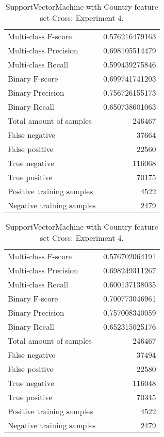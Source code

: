 \begin{table}[H]
\begin{minipage}{0.5\textwidth}
\caption{SupportVectorMachine with Country feature set Cross: Experiment 3.}
\centering
\begin{tabular}{l r}
\toprule
Multi-class F-score & 0.576216479163 \\
Multi-class Precision & 0.698105514479 \\
Multi-class Recall & 0.599439275846 \\
\midrule
Binary F-score & 0.699741741203 \\
Binary Precision & 0.756726155173 \\
Binary Recall & 0.650738601063 \\
\midrule
Total amount of samples & 246467 \\
False negative & 37664 \\
False positive & 22560 \\
True negative & 116068 \\
True positive & 70175 \\
\midrule
Positive training samples & 4522 \\
Negative training samples & 2479 \\
\bottomrule
\end{tabular}
\end{minipage}
\hfillx
\begin{minipage}{0.5\textwidth}
\caption{SupportVectorMachine with Country feature set Cross: Experiment 4.}
\centering
\begin{tabular}{l r}
\toprule
Multi-class F-score & 0.576702064191 \\
Multi-class Precision & 0.698249311267 \\
Multi-class Recall & 0.600137138035 \\
\midrule
Binary F-score & 0.700773046961 \\
Binary Precision & 0.757008340059 \\
Binary Recall & 0.652315025176 \\
\midrule
Total amount of samples & 246467 \\
False negative & 37494 \\
False positive & 22580 \\
True negative & 116048 \\
True positive & 70345 \\
\midrule
Positive training samples & 4522 \\
Negative training samples & 2479 \\
\bottomrule
\end{tabular}
\end{minipage}
\end{table}
